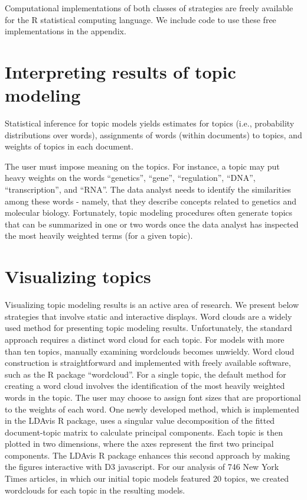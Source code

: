 \documentclass[12pt,]{article}
\begin{document}
Computational implementations of both classes of strategies are freely
available for the R statistical computing language. We include code to
use these free implementations in the appendix.

\section{Interpreting results of topic
modeling}\label{interpreting-results-of-topic-modeling}

Statistical inference for topic models yields estimates for topics
(i.e., probability distributions over words), assignments of words
(within documents) to topics, and weights of topics in each document.

The user must impose meaning on the topics. For instance, a topic may
put heavy weights on the words ``genetics'', ``gene'', ``regulation'',
``DNA'', ``transcription'', and ``RNA''. The data analyst needs to
identify the similarities among these words - namely, that they describe
concepts related to genetics and molecular biology. Fortunately, topic
modeling procedures often generate topics that can be summarized in one
or two words once the data analyst has inspected the most heavily
weighted terms (for a given topic).

\section{Visualizing topics}\label{visualizing-topics}

Visualizing topic modeling results is an active area of research. We
present below strategies that involve static and interactive displays.
Word clouds are a widely used method for presenting topic modeling
results. Unfortunately, the standard approach requires a distinct word
cloud for each topic. For models with more than ten topics, manually
examining wordclouds becomes unwieldy. Word cloud construction is
straightforward and implemented with freely available software, such as
the R package ``wordcloud''. For a single topic, the default method for
creating a word cloud involves the identification of the most heavily
weighted words in the topic. The user may choose to assign font sizes
that are proportional to the weights of each word. One newly developed
method, which is implemented in the LDAvis R package, uses a singular
value decomposition of the fitted document-topic matrix to calculate
principal components. Each topic is then plotted in two dimensions,
where the axes represent the first two principal components. The LDAvis
R package enhances this second approach by making the figures
interactive with D3 javascript. For our analysis of 746 New York Times
articles, in which our initial topic models featured 20 topics, we
created wordclouds for each topic in the resulting models.
\end{document}
